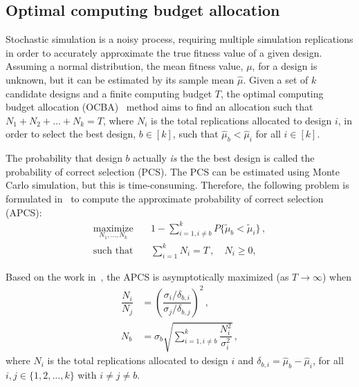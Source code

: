 \subsection{Optimal computing budget allocation}
Stochastic simulation is a noisy process, requiring multiple simulation replications in order to accurately approximate the true fitness value of a given design. Assuming a normal distribution, the mean fitness value, $\mu$, for a design is unknown, but it can be estimated by its sample mean $\hat{\mu}$. 
Given a set of $k$ candidate designs and a finite computing budget $T$, the optimal computing budget allocation (OCBA)~\cite{chen2011stochastic} method aims to find an allocation such that ${N_1 + N_2 + \ldots + N_k = T}$, where $N_i$ is the total replications allocated to design $i$, in order to select the best design, $b \in [k]$, such that $\hat{\mu}_b < \hat{\mu}_i$ for all $i \in [k]$.

The probability that design $b$ actually \emph{is} the the best design is called the probability of correct selection (PCS).
The PCS can be estimated using Monte Carlo simulation, but this is time-consuming. Therefore, the following problem is formulated in~\cite{chen2011stochastic} to compute the approximate probability of correct selection (APCS):
\begin{align}
\underset{N_1,\dots,N_k}{\text{maximize}}&\quad 1 - \displaystyle\sum^k_{i=1,i\neq b}P\{\tilde\mu_b < \tilde\mu_i\}\,,\nonumber\\
\text{such that}& \quad \displaystyle\sum^k_{i=1}N_i = T\,, \quad N_i \geq 0,
\end{align}

Based on the work in~\cite{chen2011stochastic}, the APCS is asymptotically maximized (as $T \to \infty$) when
\begin{align}
\dfrac{N_i}{N_j} &= \left(\dfrac{\sigma_i/\delta_{b,i}}{\sigma_j/\delta_{b,j}}\right)^2\,,\label{eq:apcs1}\\[0.2cm]
N_b &= \sigma_b \sqrt{\displaystyle\sum^k_{i=1,i\neq b}\dfrac{N_i^2}{\sigma_i^2}}\,,\label{eq:apcs2}
\end{align}
where $N_i$ is the total replications allocated to design $i$ and $\delta_{b,i} = \hat{\mu}_b - \hat{\mu}_i$, for all $i,j\in \{1,2,\dots,k\}$ with $i \neq j \neq b$.

